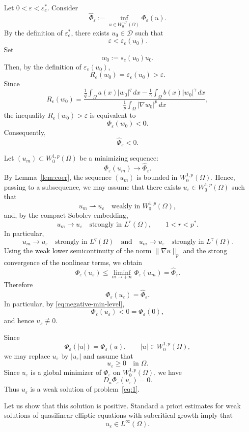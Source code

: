 \documentclass[preprint,11pt]{elsarticle}
\numberwithin{equation}{section}
\begin{document}
Let \(0<\varepsilon<\varepsilon_e^*\). Consider
\[
\hat\Phi_\varepsilon
:=
\inf_{u\in W^{1,p}_0(\Omega)}\Phi_\varepsilon(u).
\]
By the definition of \(\varepsilon_e^*\), there exists \(u_0\in\mathcal D\)
such that
\[
\varepsilon<\varepsilon_e(u_0).
\]
Set
\[
w_0:=s_e(u_0)u_0 .
\]
Then, by the definition of \(\varepsilon_e(u_0)\),
\[
R_e(w_0)=\varepsilon_e(u_0)>\varepsilon .
\]
Since
\[
R_e(w_0)
=
\frac{
	\frac1q\int_\Omega a(x)|w_0|^q\,dx
	-
	\frac1\gamma\int_\Omega b(x)|w_0|^\gamma\,dx
}{
	\frac1p\int_\Omega |\nabla w_0|^p\,dx
},
\]
the inequality \(R_e(w_0)>\varepsilon\) is equivalent to
\[
\Phi_\varepsilon(w_0)<0 .
\]
Consequently,
\begin{equation}\label{eq:negative-min-level}
	\hat\Phi_\varepsilon<0 .
\end{equation}

Let \((u_m)\subset W^{1,p}_0(\Omega)\) be a minimizing sequence:
\[
\Phi_\varepsilon(u_m)\to\hat\Phi_\varepsilon .
\]
By Lemma~\ref{lem:coer}, the sequence \((u_m)\) is bounded in
\(W^{1,p}_0(\Omega)\). Hence, passing to a subsequence, we may assume that
there exists \(u_\varepsilon\in W^{1,p}_0(\Omega)\) such that
\[
u_m\rightharpoonup u_\varepsilon
\quad\text{weakly in }W^{1,p}_0(\Omega),
\]
and, by the compact Sobolev embedding,
\[
u_m\to u_\varepsilon
\quad\text{strongly in }L^r(\Omega),
\qquad
1<r<p^* .
\]
In particular,
\[
u_m\to u_\varepsilon
\quad\text{strongly in }L^q(\Omega)
\quad\text{and}\quad
u_m\to u_\varepsilon
\quad\text{strongly in }L^\gamma(\Omega).
\]
Using the weak lower semicontinuity of the norm \(\|\nabla u\|_p\) and the
strong convergence of the nonlinear terms, we obtain
\[
\Phi_\varepsilon(u_\varepsilon)
\le
\liminf_{m\to +\infty}\Phi_\varepsilon(u_m)
=
\hat\Phi_\varepsilon .
\]
Therefore
\[
\Phi_\varepsilon(u_\varepsilon)=\hat\Phi_\varepsilon .
\]
In particular, by \eqref{eq:negative-min-level},
\[
\Phi_\varepsilon(u_\varepsilon)<0=\Phi_\varepsilon(0),
\]
and hence \(u_\varepsilon\not\equiv0\).

Since
\[
\Phi_\varepsilon(|u|)=\Phi_\varepsilon(u),
\qquad
|u|\in W^{1,p}_0(\Omega),
\]
we may replace \(u_\varepsilon\) by \(|u_\varepsilon|\) and assume that
\[
u_\varepsilon\ge0
\quad\text{in }\Omega .
\]
Since \(u_\varepsilon\) is a global minimizer of \(\Phi_\varepsilon\) on
\(W^{1,p}_0(\Omega)\), we have
\[
D_u\Phi_\varepsilon(u_\varepsilon)=0 .
\]
Thus \(u_\varepsilon\) is a weak solution of problem~\eqref{eq:1}.

Let us show that this solution is positive. Standard a priori estimates for
weak solutions of quasilinear elliptic equations with subcritical growth imply
that
\[
u_\varepsilon\in L^\infty(\Omega).
\]
\end{document}
